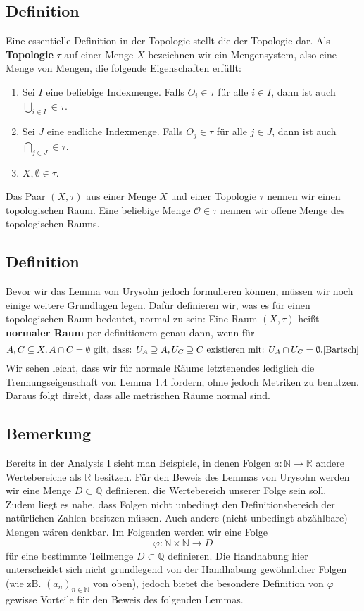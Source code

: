 \documentclass[11pt,leqno]{article}
\begin{document}
\subsection{Definition}
Eine essentielle Definition in der Topologie stellt die der Topologie dar. Als \textbf{Topologie} $\tau$ auf einer Menge $X$ bezeichnen 
wir ein Mengensystem, also eine Menge von Mengen, die folgende Eigenschaften erfüllt:
\begin{enumerate}
    \item Sei $I$ eine beliebige Indexmenge. 
    Falls $O_i \in \tau$ für alle $i \in I$, dann ist auch $\bigcup_{i \in I} \in \tau$.
    \item Sei $J$ eine endliche Indexmenge.
    Falls $O_j \in \tau$ für alle $j \in J$, dann ist auch $\bigcap_{j \in J} \in \tau$.
    \item $X, \emptyset \in \tau$.
\end{enumerate}
Das Paar $(X,\tau)$ aus einer Menge $X$ und einer Topologie $\tau$ nennen wir einen topologischen Raum. Eine beliebige Menge $\mathcal{O} \in \tau$ 
nennen wir offene Menge des topologischen Raums.

\subsection{Definition} 
Bevor wir das Lemma von Urysohn jedoch formulieren können, müssen wir noch einige weitere Grundlagen legen. Dafür definieren wir, 
was es für einen topologischen Raum bedeutet, normal zu sein: Eine Raum $(X,\tau)$ heißt \textbf{normaler Raum} per definitionem genau dann, wenn für
\[A,C\subseteq X,A\cap C=\emptyset\text{ gilt, dass: }U_A\supseteq A,U_C \supseteq C\text{ existieren mit: }U_A\cap U_C=\emptyset. \cite{Bartsch}\]
Wir sehen leicht, dass wir für normale Räume letztenendes lediglich die Trennungseigenschaft von Lemma 1.4 fordern, ohne jedoch Metriken zu benutzen.
Daraus folgt direkt, dass alle metrischen Räume normal sind.

\subsection{Bemerkung}
Bereits in der Analysis I sieht man Beispiele, in denen Folgen $a: \mathbb{N} \rightarrow \mathbb{R}$ andere Wertebereiche als $\mathbb{R}$
besitzen. Für den Beweis des Lemmas von Urysohn werden wir eine Menge $D\subset \mathbb{Q}$ definieren, die Wertebereich unserer Folge sein soll.\\ 
Zudem liegt es nahe, dass Folgen nicht unbedingt den Definitionsbereich der natürlichen Zahlen besitzen müssen. 
Auch andere (nicht unbedingt abzählbare) Mengen wären denkbar. Im Folgenden werden wir eine Folge 
\[\varphi: \mathbb{N} \times \mathbb{N} \rightarrow D\]
für eine bestimmte Teilmenge $D \subset \mathbb{Q}$ definieren. Die Handhabung hier unterscheidet sich nicht grundlegend von der Handhabung 
\glqq gewöhnlicher\grqq{} Folgen (wie zB. $(a_n)_{n \in \mathbb{N}}$ von oben), jedoch bietet die \glqq besondere\grqq{} Definition von 
$\varphi$ gewisse Vorteile für den Beweis des folgenden Lemmas.
\end{document}

